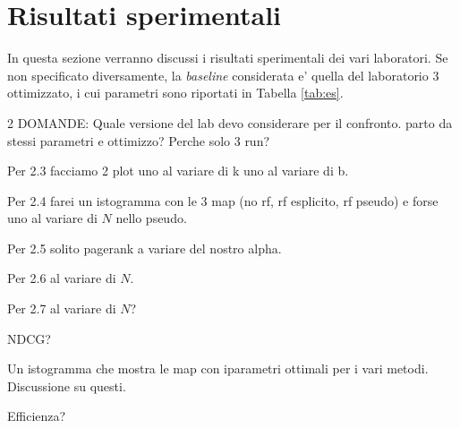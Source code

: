 \section{Risultati sperimentali}
\label{sec:risult-sper}

In questa sezione verranno discussi i risultati sperimentali dei vari laboratori. Se non specificato diversamente, la \textit{baseline} considerata e' quella del laboratorio 3 ottimizzato, i cui parametri sono riportati in Tabella \ref{tab:es}. 

2 DOMANDE:
Quale versione del lab devo considerare per il confronto. parto da stessi parametri e ottimizzo?
Perche solo 3 run?


Per 2.3 facciamo 2 plot uno al variare di k uno al variare di b.

Per 2.4 farei un istogramma con le 3 map (no rf, rf esplicito, rf pseudo) e forse uno al variare di $N$ nello pseudo.

Per 2.5 solito pagerank a variare del nostro alpha.

Per 2.6 al variare di $N$.

Per 2.7 al variare di $N$?

NDCG?

Un istogramma che mostra le map con iparametri ottimali per i vari metodi. Discussione su questi.

Efficienza?

%
%
%

